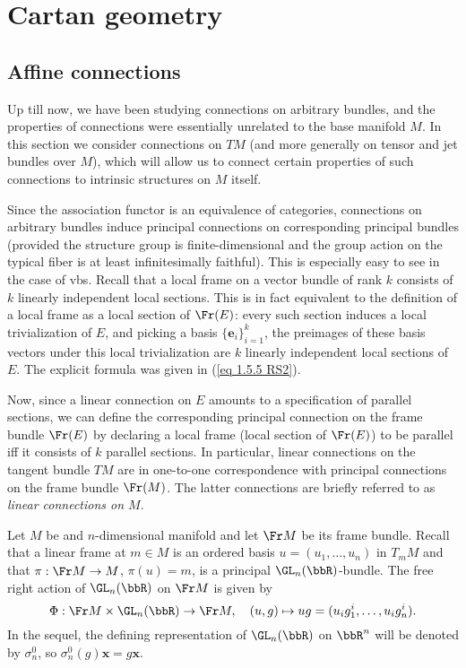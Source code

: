 \section{Cartan geometry}


\subsection{Affine connections}

Up till now, we have been studying connections on arbitrary bundles, and the properties of connections were essentially unrelated to the base manifold $M$. In this section we consider connections on $TM$ (and more generally on tensor and jet bundles over $M$), which will allow us to connect certain properties of such connections to intrinsic structures on $M$ itself.

Since the association functor is an equivalence of categories, connections on arbitrary bundles induce principal connections on corresponding principal bundles (provided the structure group is finite-dimensional and the group action on the typical fiber is at least infinitesimally faithful). This is especially easy to see in the case of \glspl{vb}. Recall that a local frame on a vector bundle of rank $k$ consists of $k$ linearly independent local sections. This is in fact equivalent to the definition of a local frame as a local section of $\Fr(E)$: every such section induces a local trivialization of $E$, and picking a basis $\{\bm{e}_i\}_{i=1}^k$, the preimages of these basis vectors under this local trivialization are $k$ linearly independent local sections of $E$. The explicit formula was given in (\ref{eq 1.5.5 RS2}).

Now, since a linear connection on $E$ amounts to a specification of parallel sections, we can define the corresponding principal connection on the frame bundle $\Fr(E)$ by declaring a local frame (local section of $\Fr(E)$) to be parallel iff it consists of $k$ parallel sections. In particular, linear connections on the tangent bundle $TM$ are in one-to-one correspondence with principal connections on the frame bundle $\Fr(M)$. The latter connections are briefly referred to as \emph{linear connections on $M$}.

Let $M$ be and $n$-dimensional manifold and let $\Fr M$ be its frame bundle. Recall that a linear frame at $m\in M$ is an ordered basis $u=(u_1,\ldots,u_n)$ in $T_m M$ and that $\pi:\Fr M\to M$, $\pi(u)=m$, is a principal $\GL_n(\bbR)$-bundle. The free right action of $\GL_n(\bbR)$ on $\Fr M$ is given by
\[\Phi:\Fr M\times \GL_n(\bbR)\to \Fr M,\quad (u,g)\mapsto ug=(u_ig^i_1,\ldots,u_ig^i_n).\]
In the sequel, the defining representation of $\GL_n(\bbR)$ on $\bbR^n$ will be denoted by $\sigma^0_n$, so $\sigma^0_n(g)\bm{x}=g\bm{x}$.


